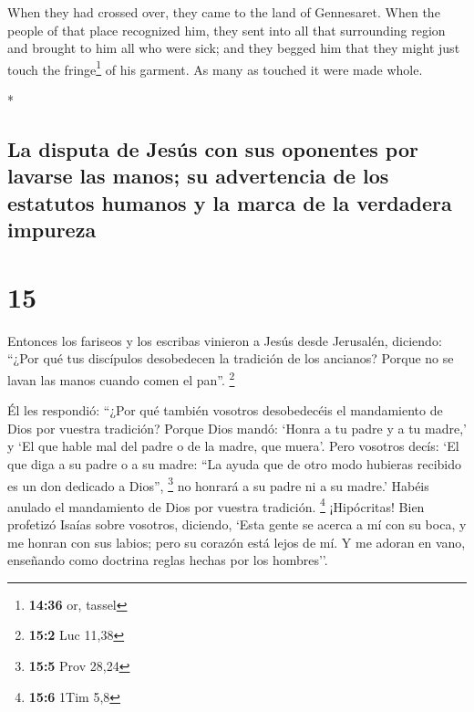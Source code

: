 \begin{paracol}{2}
\begin{otherlanguage}{english}
 When they had crossed over, they came to the land of
Gennesaret.  When the people of that place recognized
him, they sent into all that surrounding region and brought to him all
who were sick;  and they begged him that they might just
touch the fringe\footnote{\textbf{14:36} or, tassel} of his garment. As
many as touched it were made whole.

\end{otherlanguage}

\switchcolumn[0]*

\hypertarget{la-disputa-de-jesuxfas-con-sus-oponentes-por-lavarse-las-manos-su-advertencia-de-los-estatutos-humanos-y-la-marca-de-la-verdadera-impureza}{%
\subsection{La disputa de Jesús con sus oponentes por lavarse las manos;
su advertencia de los estatutos humanos y la marca de la verdadera
impureza}\label{la-disputa-de-jesuxfas-con-sus-oponentes-por-lavarse-las-manos-su-advertencia-de-los-estatutos-humanos-y-la-marca-de-la-verdadera-impureza}}

\hypertarget{section-28}{%
\section{15}\label{section-28}}

 Entonces los fariseos y los escribas vinieron a Jesús
desde Jerusalén, diciendo:  ``¿Por qué tus discípulos
desobedecen la tradición de los ancianos? Porque no se lavan las manos
cuando comen el pan''. \footnote{\textbf{15:2} Luc 11,38}

 Él les respondió: ``¿Por qué también vosotros
desobedecéis el mandamiento de Dios por vuestra tradición?
 Porque Dios mandó: `Honra a tu padre y a tu madre,' y `El
que hable mal del padre o de la madre, que muera'.  Pero
vosotros decís: `El que diga a su padre o a su madre: ``La ayuda que de
otro modo hubieras recibido es un don dedicado a Dios'', \footnote{\textbf{15:5}
  Prov 28,24}  no honrará a su padre ni a su madre.'
Habéis anulado el mandamiento de Dios por vuestra tradición. \footnote{\textbf{15:6}
  1Tim 5,8}  ¡Hipócritas! Bien profetizó Isaías sobre
vosotros, diciendo,  `Esta gente se acerca a mí con su
boca, y me honran con sus labios; pero su corazón está lejos de mí.
 Y me adoran en vano, enseñando como doctrina reglas
hechas por los hombres''.


\end{paracol}
